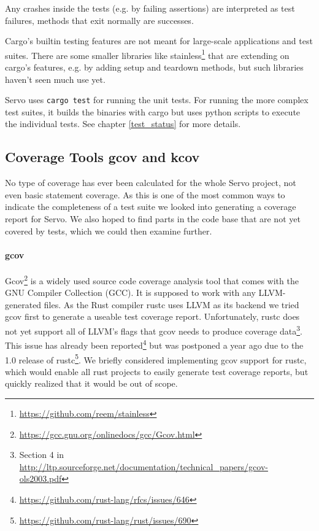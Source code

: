\documentclass{scrartcl}
\begin{document}
Any crashes inside the tests (e.g. by failing assertions) are interpreted as test failures, methods that exit normally are successes.

Cargo's builtin testing features are not meant for large-scale applications and test suites. There are some smaller libraries like stainless\footnote{\url{https://github.com/reem/stainless}} that are extending on cargo's features, e.g. by adding setup and teardown methods, but such libraries haven't seen much use yet. 

Servo uses \texttt{cargo test} for running the unit tests. For running the more complex test suites, it builds the binaries with cargo but uses python scripts to execute the individual tests. See chapter \ref{test_status} for more details.


\subsection{Coverage Tools gcov and kcov}

No type of coverage has ever been calculated for the whole Servo project, not even basic statement coverage. As this is one of the most common ways to indicate the completeness of a test suite we looked into generating a coverage report for Servo. We also hoped to find parts in the code base that are not yet covered by tests, which we could then examine further. 

\paragraph{gcov}
Gcov\footnote{\url{https://gcc.gnu.org/onlinedocs/gcc/Gcov.html}} is a widely used source code coverage analysis tool that comes with the GNU Compiler Collection (GCC). It is supposed to work with any LLVM-generated files. As the Rust compiler rustc uses LLVM as its backend we tried gcov first to generate a useable test coverage report. Unfortunately, rustc does not yet support all of LLVM's flags that gcov needs to produce coverage data\footnote{Section 4 in \url{http://ltp.sourceforge.net/documentation/technical_papers/gcov-ols2003.pdf}}. This issue has already been reported\footnote{\url{https://github.com/rust-lang/rfcs/issues/646}} but was postponed a year ago due to the 1.0 release of rustc\footnote{\url{https://github.com/rust-lang/rust/issues/690}}. We briefly considered implementing gcov support for rustc, which would enable all rust projects to easily generate test coverage reports, but quickly realized that it would be out of scope.
\end{document}

